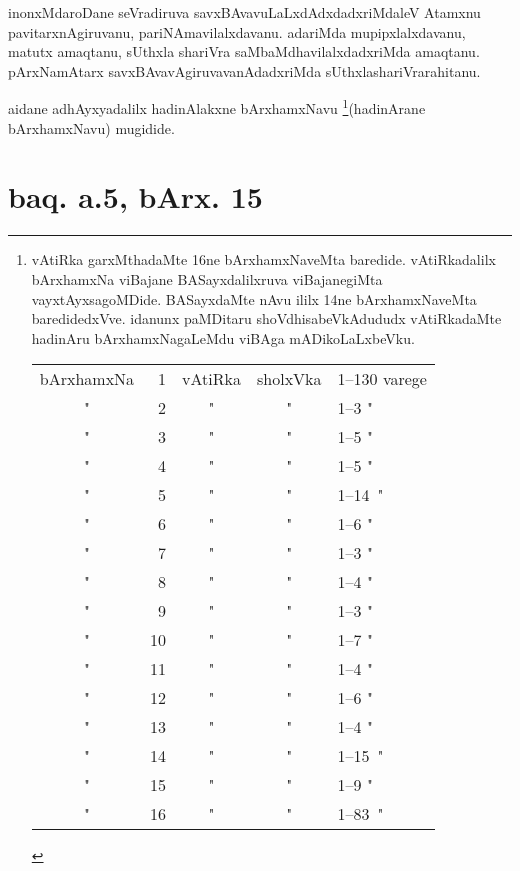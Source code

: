 \begin{artha} 
inonxMdaroDane seVradiruva savxBAvavuLaLxdAdxdadxriMdaleV Atamxnu 
pavitarxnAgiruvanu, pariNAmavilalxdavanu. adariMda mupipxlalxdavanu, 
matutx amaqtanu, sUthxla shariVra saMbaMdhavilalxdadxriMda amaqtanu. 
pArxNamAtarx savxBAvavAgiruvavanAdadxriMda sUthxlashariVrarahitanu.
\end{artha}

aidane adhAyxyadalilx hadinAlakxne bArxhamxNavu 
\footnote[2]{vAtiRka garxMthadaMte 16ne bArxhamxNaveMta baredide. 
vAtiRkadalilx bArxhamxNa viBajane BASayxdalilxruva viBajanegiMta 
vayxtAyxsagoMDide. BASayxdaMte nAvu ililx 14ne bArxhamxNaveMta 
baredidedxVve. idanunx paMDitaru shoVdhisabeVkAdududx vAtiRkadaMte 
hadinAru bArxhamxNagaLeMdu viBAga mADikoLaLxbeVku.\\ 
\begin{tabular}{crccl}bArxhamxNa & 1 & vAtiRka & sholxVka & 1{\rm --}130 
varege\\
" & 2 & " & " & 1{\rm --}3 \qquad "\\
" & 3 & " & " & 1{\rm --}5 \qquad "\\ 
" & 4 & " & " & 1{\rm --}5 \qquad "\\
" & 5 & " & " & 1{\rm --}14 \quad \,"\\ 
" & 6 & " & " & 1{\rm --}6 \qquad "\\
" & 7 & " & " & 1{\rm --}3 \qquad "\\
" & 8 & " & " & 1{\rm --}4 \qquad "\\
" & 9 & " & " & 1{\rm --}3 \qquad "\\
" & 10 & " & " & 1{\rm --}7 \qquad "\\
" & 11 & " & " & 1{\rm --}4 \qquad "\\
" & 12 & " & " & 1{\rm --}6 \qquad "\\
" & 13 & " & " & 1{\rm --}4 \qquad "\\
" & 14 & " & " & 1{\rm --}15 \quad \,"\\
" & 15 & " & " & 1{\rm --}9 \qquad "\\
" & 16 & " & " & 1{\rm --}83 \quad \,"\end{tabular}}(hadinArane bArxhamxNavu) mugidide.

\eject

\section*{baq. a.5, bArx. 15}


